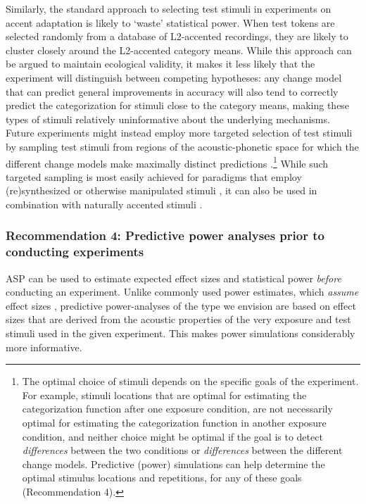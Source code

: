 \documentclass[
  11pt,
  man,floatsintext]{apa6}
\begin{document}
Similarly, the standard approach to selecting test stimuli in experiments on accent adaptation is likely to `waste' statistical power. When test tokens are selected randomly from a database of L2-accented recordings, they are likely to cluster closely around the L2-accented category means. While this approach can be argued to maintain ecological validity, it makes it less likely that the experiment will distinguish between competing hypotheses: any change model that can predict general improvements in accuracy will also tend to correctly predict the categorization for stimuli close to the category means, making these types of stimuli relatively uninformative about the underlying mechanisms. Future experiments might instead employ more targeted selection of test stimuli by sampling test stimuli from regions of the acoustic-phonetic space for which the different change models make maximally distinct predictions \autocite[for initial efforts, see][]{burchill-jaeger2022}.\footnote{The optimal choice of stimuli depends on the specific goals of the experiment. For example, stimuli locations that are optimal for estimating the categorization function after one exposure condition, are not necessarily optimal for estimating the categorization function in another exposure condition, and neither choice might be optimal if the goal is to detect \emph{differences} between the two conditions or \emph{differences} between the different change models. Predictive (power) simulations can help determine the optimal stimulus locations and repetitions, for any of these goals (Recommendation 4).} While such targeted sampling is most easily achieved for paradigms that employ (re)synthesized or otherwise manipulated stimuli \autocites[for examples, see][]{bejjanki2011,burchill-jaeger2022,idemaru-holt2020}, it can also be used in combination with naturally accented stimuli \autocite[see][]{chodroff-wilson2020}.

\subsubsection{Recommendation 4: Predictive power analyses prior to conducting experiments}\label{recommendation-4-predictive-power-analyses-prior-to-conducting-experiments}

ASP can be used to estimate expected effect sizes and statistical power \emph{before} conducting an experiment. Unlike commonly used power estimates, which \emph{assume} effect sizes \autocite[e.g., ``moderate'' effects,][]{zheng-samuel2020}, predictive power-analyses of the type we envision are based on effect sizes that are derived from the acoustic properties of the very exposure and test stimuli used in the given experiment. This makes power simulations considerably more informative.
\end{document}
